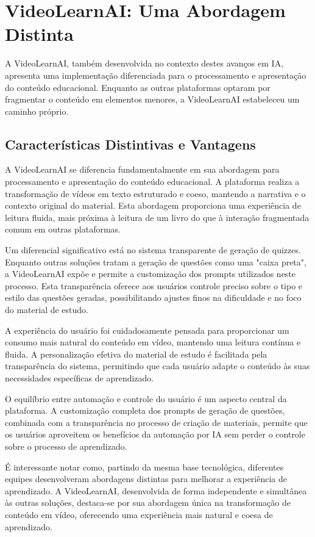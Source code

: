 \documentclass[tcc,capa]{texufpel}
\begin{document}
\section{VideoLearnAI: Uma Abordagem Distinta}
A VideoLearnAI, também desenvolvida no contexto destes avanços em IA, apresenta uma implementação diferenciada para o processamento e apresentação do conteúdo educacional. Enquanto as outras plataformas optaram por fragmentar o conteúdo em elementos menores, a VideoLearnAI estabeleceu um caminho próprio.

\subsection{Características Distintivas e Vantagens}

A VideoLearnAI se diferencia fundamentalmente em sua abordagem para processamento e apresentação do conteúdo educacional. A plataforma realiza a transformação de vídeos em texto estruturado e coeso, mantendo a narrativa e o contexto original do material. Esta abordagem proporciona uma experiência de leitura fluida, mais próxima à leitura de um livro do que à interação fragmentada comum em outras plataformas.

Um diferencial significativo está no sistema transparente de geração de quizzes. Enquanto outras soluções tratam a geração de questões como uma "caixa preta", a VideoLearnAI expõe e permite a customização dos prompts utilizados neste processo. Esta transparência oferece aos usuários controle preciso sobre o tipo e estilo das questões geradas, possibilitando ajustes finos na dificuldade e no foco do material de estudo.

A experiência do usuário foi cuidadosamente pensada para proporcionar um consumo mais natural do conteúdo em vídeo, mantendo uma leitura contínua e fluida. A personalização efetiva do material de estudo é facilitada pela transparência do sistema, permitindo que cada usuário adapte o conteúdo às suas necessidades específicas de aprendizado.

O equilíbrio entre automação e controle do usuário é um aspecto central da plataforma. A customização completa dos prompts de geração de questões, combinada com a transparência no processo de criação de materiais, permite que os usuários aproveitem os benefícios da automação por IA sem perder o controle sobre o processo de aprendizado.

É interessante notar como, partindo da mesma base tecnológica, diferentes equipes desenvolveram abordagens distintas para melhorar a experiência de aprendizado. A VideoLearnAI, desenvolvida de forma independente e simultânea às outras soluções, destaca-se por sua abordagem única na transformação de conteúdo em vídeo, oferecendo uma experiência mais natural e coesa de aprendizado.
\end{document}
